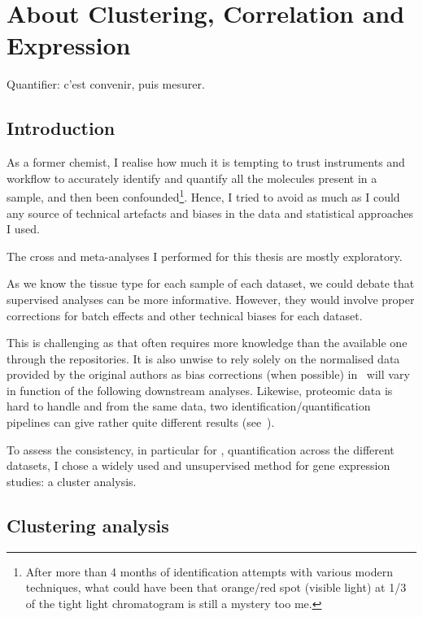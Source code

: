 \chapter{About Clustering, Correlation and Expression}
\label{ch:expression}

\setlength{\epigraphwidth}{0.45\textwidth}
\setlength{\epigraphrule}{0.1pt}
\epigraph{Quantifier: c'est convenir, puis mesurer.}{\cite{Desrosieres}}

\section{Introduction}

As a former chemist, I realise how much it is tempting to trust instruments and
workflow to accurately identify and quantify all the molecules present in a sample,
and then been confounded\footnote{After more than 4 months of identification attempts
with various modern techniques, what could have been that orange/red spot
(visible light) at 1/3 of the tight light chromatogram is still a mystery too me.}.
Hence, I tried to avoid as much as I could any source of technical
artefacts and biases in the data and statistical approaches I used.

The cross and meta-analyses I performed for this thesis are mostly exploratory.

As we know the tissue type for each sample of each dataset,
we could debate that supervised analyses can be more informative.
However, they would involve proper corrections
for batch effects and other technical biases for each dataset.

This is challenging as that often requires more knowledge than the available one
through the repositories. It is also unwise to rely solely on the normalised data
provided by the original authors as bias corrections (when possible)
in \Rnaseq\ will vary in function of the following downstream analyses.
Likewise, proteomic data is hard to handle and from the same data,
two identification/quantification pipelines can give rather quite
different results (see~).

To assess the consistency, in particular for \Rnaseq, quantification across
the different datasets, I chose a widely used and unsupervised method for gene
expression studies: a cluster analysis.

\section{Clustering analysis}

